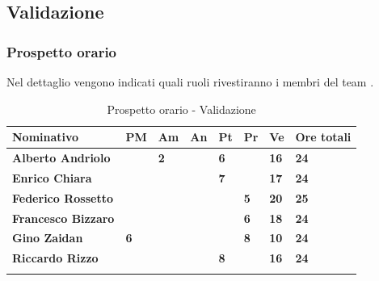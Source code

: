 \subsection{Validazione}
\subsubsection{Prospetto orario}
Nel dettaglio vengono indicati quali ruoli rivestiranno i membri del team 
\GRUPPO.
\begin{center}
	\def\arraystretch{1.6}
	\bgroup
	\begin{longtable}{| p{4cm} | p{1cm} | p{1cm} | p{1cm} | p{1cm}| p{1cm} | 
			p{1cm} | p{1.7cm}|}
		\hline
		\textbf{Nominativo} & \textbf{PM} & \textbf{Am} & \textbf{An} & 
		\textbf{Pt} & \textbf{Pr} & \textbf{Ve} & \textbf{Ore totali}\\ 
		
		\hline \hline  
		
		\textbf{Alberto Andriolo} & \textbf{} & \textbf{2} & \textbf{} & 
		\textbf{6} & \textbf{} & \textbf{16} & \textbf{24}\\ 
		\hline 
		
		\textbf{Enrico Chiara} & \textbf{} & \textbf{} & \textbf{} & 
		\textbf{7} & \textbf{} & \textbf{17} & \textbf{24}\\ 
		\hline 
		
		\textbf{Federico Rossetto} & \textbf{} & \textbf{} & \textbf{} & 
		\textbf{} & \textbf{5} & \textbf{20} & \textbf{25}\\ 
		\hline 
		
		\textbf{Francesco Bizzaro} & \textbf{} & \textbf{} & \textbf{} & 
		\textbf{} & \textbf{6} & \textbf{18} & \textbf{24}\\ 
		\hline 
		
		\textbf{Gino Zaidan} & \textbf{6} & \textbf{} & \textbf{} & 
		\textbf{} & \textbf{8} & \textbf{10} & \textbf{24}\\ 
		\hline 
		
		\textbf{Riccardo Rizzo} & \textbf{} & \textbf{} & \textbf{} & 
		\textbf{8} & \textbf{} & \textbf{16} & \textbf{24}\\ 
		\hline 
		
		\hline 
		
		\caption{Prospetto orario - Validazione}
	\end{longtable}
	\egroup
\end{center}
